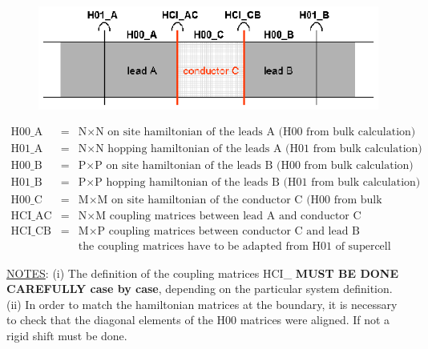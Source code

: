 \begin{figure}[h]
\includegraphics{acb.eps}\label{acb:ham}
\end{figure}
\begin{displaymath}
\begin{array}{lll}
\textrm{H00\_A} &=& \textrm{N}\times\textrm{N on site hamiltonian
of the leads A (H00 from bulk calculation)}\\
\textrm{H01\_A} &=& \textrm{N}\times\textrm{N hopping hamiltonian
of the leads A (H01 from bulk calculation)}\\
\textrm{H00\_B} &=& \textrm{P}\times\textrm{P on site hamiltonian
of the leads B (H00 from bulk calculation)}\\
\textrm{H01\_B} &=& \textrm{P}\times\textrm{P hopping hamiltonian
of the leads B (H01 from bulk calculation)}\\
\textrm{H00\_C} &=& \textrm{M}\times\textrm{M on site hamiltonian
of the conductor C (H00 from bulk calculation)}\\
\textrm{HCI\_AC} &=& \textrm{N}\times\textrm{M coupling matrices
between lead A and conductor C}\\
\textrm{HCI\_CB} &=& \textrm{M}\times\textrm{P coupling matrices
between conductor C and lead B}\\
\textrm{ } &\textrm{ }& \textrm{the coupling matrices have to be
adapted from H01 of supercell calculation}
\end{array}
\end{displaymath}

\noindent \underline{NOTES}: (i) The definition of the coupling
matrices HCI\_ {\bf MUST BE DONE CAREFULLY case by case},
depending on the particular system definition. (ii) In order to
match the hamiltonian matrices at the boundary, it is necessary to
check that the diagonal elements of the H00 matrices were aligned.
If not a rigid shift must be done.

